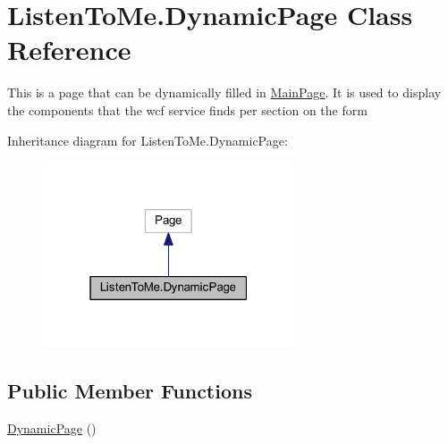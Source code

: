 \hypertarget{class_listen_to_me_1_1_dynamic_page}{}\section{Listen\+To\+Me.\+Dynamic\+Page Class Reference}
\label{class_listen_to_me_1_1_dynamic_page}


This is a page that can be dynamically filled in \mbox{\hyperlink{class_listen_to_me_1_1_main_page}{Main\+Page}}. It is used to display the components that the wcf service finds per section on the form  




Inheritance diagram for Listen\+To\+Me.\+Dynamic\+Page\+:\nopagebreak
\begin{figure}[H]
\begin{center}
\leavevmode
\includegraphics[width=211pt]{class_listen_to_me_1_1_dynamic_page__inherit__graph}
\end{center}
\end{figure}
\subsection*{Public Member Functions}
\begin{DoxyCompactItemize}
\item 
\mbox{\hyperlink{class_listen_to_me_1_1_dynamic_page_aee4e65517f3b3f4bda37fec075ee0371}{Dynamic\+Page}} ()
\end{DoxyCompactItemize}
